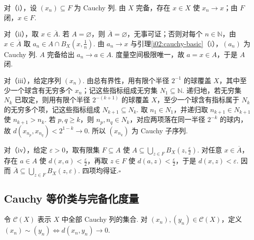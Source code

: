 \begin{FAProof}
对（i），设 \(\displaystyle (x_n)\subseteq F\) 为 Cauchy 列. 由 \(\displaystyle X\) 完备，存在 \(\displaystyle x\in X\) 使 \(\displaystyle x_n\to x\)；由 \(\displaystyle F\) 闭，\(\displaystyle x\in F\).

对（ii），取 \(\displaystyle x\in\overline A\). 若 \(\displaystyle A=\varnothing\)，则 \(\displaystyle \overline A=\varnothing\)，无事可证；否则对每个 \(\displaystyle n\in\mathbb N\)，由 \(\displaystyle x\in\overline A\) 取 \(\displaystyle a_n\in A\cap B_X(x,\frac{1}{n})\). 由 \(\displaystyle a_n\to x\) 与引理\ref{i02:cauchy-basic}（i），\(\displaystyle (a_n)\) 为 Cauchy 列. \(\displaystyle A\) 完备给出 \(\displaystyle a_n\to a\in A\). 度量空间极限唯一，故 \(\displaystyle a=x\in A\)，于是 \(\displaystyle A\) 闭.

对（iii），给定序列 \(\displaystyle (x_n)\). 由总有界性，用有限个半径 \(\displaystyle 2^{-1}\) 的球覆盖 \(\displaystyle X\)，其中至少一个球含有无穷多个 \(\displaystyle x_n\)；记这些指标组成无穷集 \(\displaystyle N_1\subseteq\mathbb N\). 递归地，若无穷集 \(\displaystyle N_k\) 已取定，则用有限个半径 \(\displaystyle 2^{-(k+1)}\) 的球覆盖 \(\displaystyle X\)，至少一个球含有指标属于 \(\displaystyle N_k\) 的无穷多个项，记这些指标组成 \(\displaystyle N_{k+1}\subseteq N_k\). 取 \(\displaystyle n_1\in N_1\)，并递归取 \(\displaystyle n_{k+1}\in N_{k+1}\) 使 \(\displaystyle n_{k+1}>n_k\). 若 \(\displaystyle p,q\geqslant k\)，则 \(\displaystyle n_p,n_q\in N_k\)，对应两项落在同一半径 \(\displaystyle 2^{-k}\) 的球内，故
\(\displaystyle d(x_{n_p},x_{n_q})<2^{1-k}\to0\).
所以 \(\displaystyle (x_{n_k})\) 为 Cauchy 子序列.

对（iv），给定 \(\displaystyle \varepsilon>0\)，取有限集 \(\displaystyle F\subseteq A\) 使 \(\displaystyle A\subseteq\bigcup_{z\in F}B_X(z,\frac{\varepsilon}{2})\). 对任意 \(\displaystyle x\in\overline A\)，存在 \(\displaystyle a\in A\) 使 \(\displaystyle d(x,a)<\frac{\varepsilon}{2}\)，再取 \(\displaystyle z\in F\) 使 \(\displaystyle d(a,z)<\frac{\varepsilon}{2}\)，于是 \(\displaystyle d(x,z)<\varepsilon\). 因而 \(\displaystyle \overline A\subseteq\bigcup_{z\in F}B_X(z,\varepsilon)\). 四项均得证.\hfill\(\square\)
\end{FAProof}

\subsection{Cauchy 等价类与完备化度量}

令 \(\displaystyle \mathcal C(X)\) 表示 \(\displaystyle X\) 中全部 Cauchy 列的集合. 对 \(\displaystyle (x_n),(y_n)\in\mathcal C(X)\)，定义 \(\displaystyle (x_n)\sim(y_n)\iff d(x_n,y_n)\to0\).

